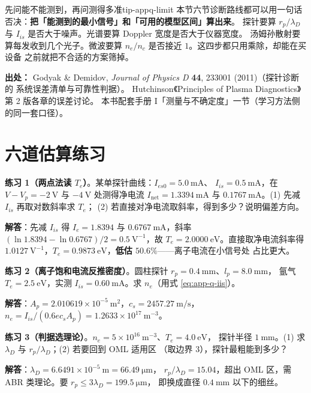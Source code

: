 \begin{tip}{先问能不能测到，再问测得多准}{tip-appq-limit}
本节六节诊断路线都可以用一句话否决：\textbf{把「能测到的最小信号」和「可用的模型区间」算出来}。
探针要算 $r_p/\lambda_D$ 与 $I_{is}$ 是否大于噪声。光谱要算 Doppler 宽度是否大于仪器宽度。
汤姆孙散射要算每发收到几个光子。微波要算 $n_e/n_c$ 是否接近 $1$。这四步都只用乘除，却能在买设备
之前就把不合适的方案筛掉。
\end{tip}

{\footnotesize
\textbf{出处：} Godyak \& Demidov, \emph{Journal of Physics D} \textbf{44}, 233001 (2011)（探针诊断的
系统误差清单与可靠性判据）。
Hutchinson《Principles of Plasma Diagnostics》第 2 版各章的误差讨论。
本书配套手册 I「测量与不确定度」一节（学习方法侧的同一套口径）。
}

\section{六道估算练习}
\label{sec:app-q-problems}


\textbf{练习 1（两点法读 $T_e$）}。某单探针曲线：$I_{es0}=5.0\ \mathrm{mA}$、
$I_{is}=0.5\ \mathrm{mA}$，在 $V-V_p=-2\ \mathrm{V}$ 与 $-4\ \mathrm{V}$ 处测得净电流
$I_{\mathrm{net}}=1.3394\ \mathrm{mA}$ 与 $0.1767\ \mathrm{mA}$。(1) 先减 $I_{is}$ 再取对数斜率求 $T_e$；
(2) 若直接对净电流取斜率，得到多少？说明偏差方向。

\textbf{解答}：先减 $I_{is}$ 得 $I_e=1.8394$ 与 $0.6767\ \mathrm{mA}$，斜率
$(\ln1.8394-\ln0.6767)/2=0.5\ \mathrm{V^{-1}}$，故 $T_e=2.0000\ \mathrm{eV}$。直接取净电流斜率得
$1.0127\ \mathrm{V^{-1}}$，$T_e=0.9873\ \mathrm{eV}$，\textbf{低估 $50.6\%$}——离子电流在小信号处
占比更大。

\textbf{练习 2（离子饱和电流反推密度）}。圆柱探针 $r_p=0.4\ \mathrm{mm}$、$l_p=8.0\ \mathrm{mm}$，
氩气 $T_e=2.5\ \mathrm{eV}$，实测 $I_{is}=0.60\ \mathrm{mA}$。求 $n_e$（用式 \eqref{eq:app-q-iis}）。

\textbf{解答}：$A_p=2.010619\times10^{-5}\ \mathrm{m^2}$，$c_s=2457.27\ \mathrm{m/s}$，
$n_e=I_{is}/(0.6ec_sA_p)=1.2633\times10^{17}\ \mathrm{m^{-3}}$。

\textbf{练习 3（判据选理论）}。$n_e=5\times10^{16}\ \mathrm{m^{-3}}$、$T_e=4.0\ \mathrm{eV}$，
探针半径 $1\ \mathrm{mm}$。(1) 求 $\lambda_D$ 与 $r_p/\lambda_D$；(2) 若要回到 OML 适用区
（取边界 $3$），探针最粗能到多少？

\textbf{解答}：$\lambda_D=6.6491\times10^{-5}\ \mathrm{m}=66.49\ \mathrm{\mu m}$，
$r_p/\lambda_D=15.04$，超出 OML 区，需 ABR 类理论。要 $r_p\le3\lambda_D=199.5\ \mathrm{\mu m}$，
即换成直径 $0.4\ \mathrm{mm}$ 以下的细丝。

